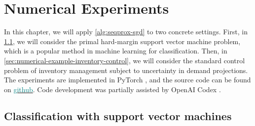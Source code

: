 \chapter{Numerical Experiments}
\label{chap:numerical-experiments}

In this chapter, we will apply \cref{alg:seqprox-sgd} to
two concrete settings. First, in \cref{sec:numerical-example-svm},
we will consider the primal hard-margin support vector machine problem,
which is a popular method in machine learning for classification.
Then, in \cref{sec:numerical-example-inventory-control}, we will
consider the standard control problem of inventory management subject
to uncertainty in demand projections.
The experiments are implemented in PyTorch \cite{paszke2019pytorch}, and the source code
can be found on \href{https://github.com/amlava/thesis}{\textcolor{teal}{github}}.
Code development was partially assisted by OpenAI Codex \cite{openai_codex_2025}.

\section{Classification with support vector machines}
\label{sec:numerical-example-svm}

